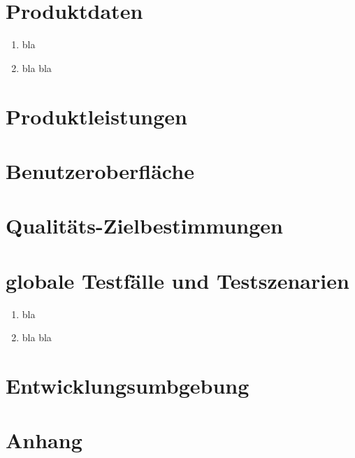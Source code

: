 \documentclass[parskip=full]{scrartcl}
\def\threedigits#1{%
  \ifnum#1<100 0\fi
  \ifnum#1<10 0\fi
  \number#1}
\begin{document}
\section{Produktdaten}

\begin{enumerate}[label={\textbf{/D\protect\threedigits{\theenumi}0/}}, leftmargin=*]
	\item bla
	\item bla bla
\end{enumerate}

\section{Produktleistungen}

\section{Benutzeroberfläche}

\section{Qualitäts-Zielbestimmungen}

\section{globale Testfälle und Testszenarien}

\begin{enumerate}[label={\textbf{/T\protect\threedigits{\theenumi}0/}}, leftmargin=*]
	\item bla
	\item bla bla
\end{enumerate}

\section{Entwicklungsumbgebung}

\section{Anhang}	
\end{document}
